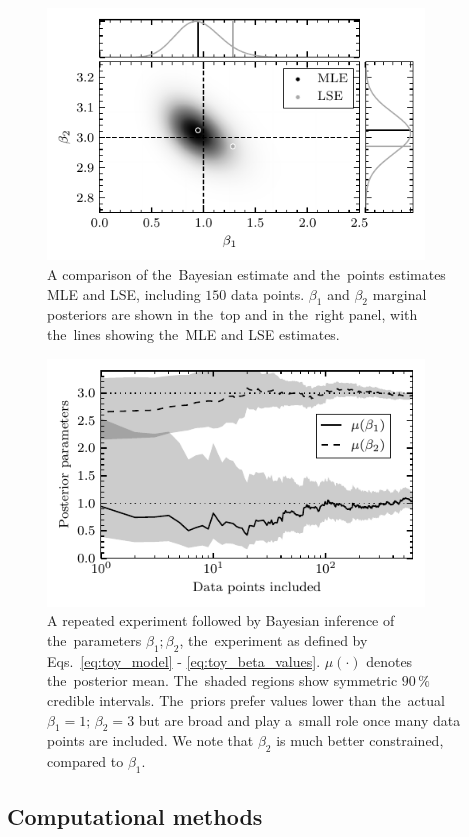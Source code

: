 \begin{figure}[ht]
 	\centering
 	\includegraphics[width=10cm]{figures/bayesian_multivariate.pdf}
 	\caption{A comparison of the~Bayesian estimate and the~points estimates MLE and LSE, including $150$ data points. $\beta_1$ and $\beta_2$ marginal posteriors are shown in the~top and in the~right panel, with the~lines showing the~MLE and LSE estimates.}
 	\label{fig:bayesian_multivariate}
\end{figure}

\begin{figure}[ht]
 	\centering
 	\includegraphics[width=10cm]{figures/bayesian.pdf}
 	\caption{A repeated experiment followed by Bayesian inference of the~parameters $\beta_1; \beta_2$, the~experiment as defined by Eqs.~\ref{eq:toy_model} - \ref{eq:toy_beta_values}. $\mu(\cdot)$ denotes the~posterior mean. The~shaded regions show symmetric $90 \, \%$ credible intervals. The~priors prefer values lower than the~actual $\beta_1=1;\,\beta_2=3$ but are broad and play a~small role once many data points are included. We note that $\beta_2$ is much better constrained, compared to $\beta_1$.}
 	\label{fig:bayesian_demosntration}
\end{figure}

\subsection{Computational methods}

